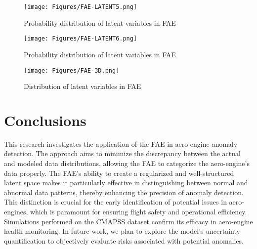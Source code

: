 \documentclass[journal]{IEEEtran}
\begin{document}
\begin{figure}
\centering
	\texttt{[image: Figures/FAE-LATENT5.png]}
	\caption{Probability distribution of latent variables in FAE}
	\label{FAEL1}
\end{figure}

\begin{figure}
\centering
	\texttt{[image: Figures/FAE-LATENT6.png]}
	\caption{Probability distribution of latent variables in FAE}
	\label{FAEL2}
\end{figure}

\begin{figure}
\centering
	\texttt{[image: Figures/FAE-3D.png]}
	\caption{Distribution of latent variables in FAE}
	\label{FAEL4}
\end{figure}



\section{Conclusions}

This research investigates the application of the FAE in aero-engine anomaly detection. The approach aims to minimize the discrepancy between the actual and modeled data distributions, allowing the FAE to categorize the aero-engine's data properly. The FAE's ability to create a regularized and well-structured latent space makes it particularly effective in distinguishing between normal and abnormal data patterns, thereby enhancing the precision of anomaly detection. This distinction is crucial for the early identification of potential issues in aero-engines, which is paramount for ensuring flight safety and operational efficiency. Simulations performed on the CMAPSS dataset confirm its efficacy in aero-engine health monitoring. In future work, we plan to explore the model's uncertainty quantification to objectively evaluate risks associated with potential anomalies.
\end{document}
